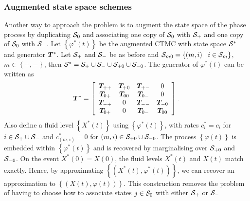 \subsubsection{Augmented state space schemes}\label{subsec: augmented }
Another way to approach the problem is to augment the state space of the phase process by duplicating \(\mathcal{S}_0\) and associating one copy of \(\mathcal{S}_0\) with \(\mathcal{S}_+\) and one copy of \(\mathcal{S}_0\) with \(\mathcal{S}_-\). Let \(\left\{\varphi^*(t)\right\}\) be the augmented CTMC with state space \(\mathcal{S}^*\) and generator \(\boldsymbol{T}^*\). Let \(\mathcal{S}_+\) and \(\mathcal{S}_-\) be as before and \(\mathcal{S}_{m0} = \left\{(m,i)\mid i\in\mathcal{S}_m\right\}\), \(m\in\left\{+,-\right\}\), then \(\mathcal{S}^* = \mathcal{S}_+\cup\mathcal{S}_-\cup\mathcal{S}_{+0}\cup\mathcal{S}_{-0}\). 
The generator of \(\varphi^*(t)\) can be written as 
\[\boldsymbol{T}^* = \left[\begin{array}{cccc} \boldsymbol{T}_{++} & \boldsymbol{T}_{+0} & \boldsymbol{T}_{+-} & 0 \\ \boldsymbol{T}_{0+} & \boldsymbol{T}_{00} & \boldsymbol{T}_{0-} & 0 \\ \boldsymbol{T}_{-+} & 0 & \boldsymbol{T}_{--} & \boldsymbol{T}_{-0} \\  \boldsymbol{T}_{0+} & 0 & \boldsymbol{T}_{0-} & \boldsymbol{T}_{00} \end{array}\right]. \]
Also define a fluid level \(\left\{X^*(t)\right\}\) using \(\left\{\varphi^*(t)\right\}\), with rates \(c_i^*=c_i\) for \(i\in\mathcal{S}_+\cup\mathcal{S}_-\) and \(c_{(m,i)}^* = 0\) for \((m,i)\in\mathcal{S}_{+0}\cup\mathcal{S}_{-0}\). The process \(\left\{\varphi(t)\right\}\) is embedded within \(\left\{\varphi^*(t)\right\}\) and is recovered by marginalising over \(\mathcal{S}_{+0}\) and \(\mathcal{S}_{-0}\). On the event \(X^*(0)=X(0)\), the fluid levels \(X^*(t)\) and \(X(t)\) match exactly. Hence, by approximating \(\left\{(X^*(t),\varphi^*(t))\right\}\), we can recover an approximation to \(\left\{(X(t),\varphi(t))\right\}\). This construction removes the problem of having to choose how to associate states \(j\in\mathcal{S}_0\) with either \(\mathcal{S}_+\) or \(\mathcal{S}_-\)

